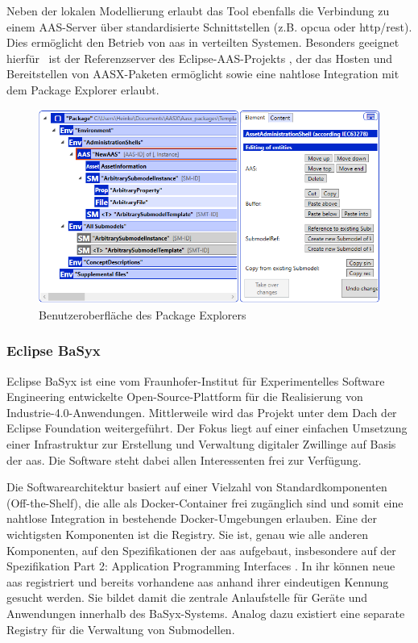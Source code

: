 Neben der lokalen Modellierung erlaubt das Tool ebenfalls die Verbindung zu einem AAS-Server über standardisierte Schnittstellen (z.B. \acs{opcua} oder \acs{http}/\acs{rest}).
Dies ermöglicht den Betrieb von \acs{aas} in verteilten Systemen.
Besonders geeignet hierfür%
\pagebreak
~ist der Referenzserver des Eclipse-AAS-Projekts \cite{AASXServer}, der das Hosten und Bereitstellen von AASX-Paketen ermöglicht sowie eine nahtlose Integration mit dem Package Explorer erlaubt.

\begin{figure}[htbp]
    \centering
    \includegraphics[scale=0.765]{Bilder/ModellierungAAS/Final/Grundlagen_PE.PNG}
    \caption[Benutzeroberfläche des Package Explorers]{Benutzeroberfläche des Package Explorers} 
    \label{fig:AASXPackageExplorer}
\end{figure}

\subsubsection{Eclipse BaSyx }
Eclipse BaSyx ist eine vom Fraunhofer-Institut für Experimentelles Software Engineering entwickelte Open-Source-Plattform für die Realisierung von Industrie-4.0-Anwendungen.
Mittlerweile wird das Projekt unter dem Dach der Eclipse Foundation weitergeführt.
Der Fokus liegt auf einer einfachen Umsetzung einer Infrastruktur zur Erstellung und Verwaltung digitaler Zwillinge auf Basis der \acs{aas}.
Die Software steht dabei allen Interessenten frei zur Verfügung.

Die Softwarearchitektur basiert auf einer Vielzahl von Standardkomponenten (Off-the-Shelf), die alle als Docker-Container frei zugänglich sind und somit eine nahtlose Integration in bestehende Docker-Umgebungen erlauben.
Eine der wichtigsten Komponenten ist die Registry. 
Sie ist, genau wie alle anderen Komponenten, auf den Spezifikationen der \acs{aas} aufgebaut, insbesondere auf der Spezifikation Part 2: Application Programming Interfaces \cite{SpezifikationPart2}.
In ihr können neue \acs{aas} registriert und bereits vorhandene \acs{aas} anhand ihrer eindeutigen Kennung gesucht werden.
Sie bildet damit die zentrale Anlaufstelle für Geräte und Anwendungen innerhalb des BaSyx-Systems.
Analog dazu existiert eine separate Registry für die Verwaltung von Submodellen.

